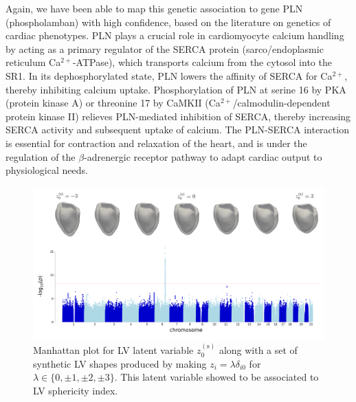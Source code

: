 Again, we have been able to map this genetic association to gene PLN (phospholamban) with high confidence, based on the literature on genetics of cardiac phenotypes. 
PLN plays a crucial role in cardiomyocyte calcium handling by acting as a primary regulator of the SERCA protein (sarco/endoplasmic reticulum Ca$^{2+}$-ATPase), which transports calcium from the cytosol into the SR1. In its dephosphorylated state, PLN lowers the affinity of SERCA for Ca$^{2+}$, thereby inhibiting calcium uptake. Phosphorylation of PLN at serine 16 by PKA (protein kinase A) or threonine 17 by CaMKII (Ca$^{2+}$/calmodulin-dependent protein kinase II) relieves PLN-mediated inhibition of SERCA, thereby increasing SERCA activity and subsequent uptake of calcium. The PLN-SERCA interaction is essential for contraction and relaxation of the heart, and is under the regulation of the $\beta$-adrenergic receptor pathway to adapt cardiac output to physiological needs. \cite{maclennan_2003}

\begin{figure}[ht!]
\includegraphics[width=\textwidth]{figs/gwas/GWAS_Experiment1_z0s_scaled_meshes.png}
\caption{Manhattan plot for LV latent variable $z_0^{(\text{s})}$ along with a set of synthetic LV shapes produced by making $z_i=\lambda \delta_{i0}$ for $\lambda\in\{0, \pm 1, \pm 2, \pm 3\}$. This latent variable showed to be associated to LV sphericity index.}
\label{fig:manhattan_LV_latent}
\end{figure}

